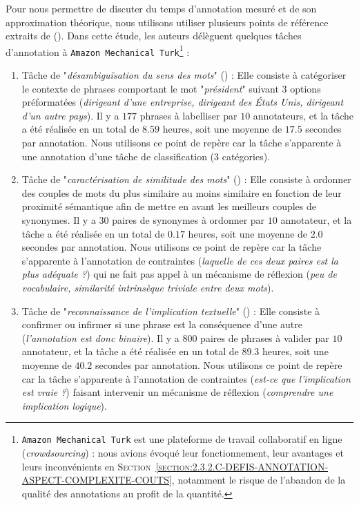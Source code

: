 			Pour nous permettre de discuter du temps d'annotation mesuré et de son approximation théorique, nous utilisons utiliser plusieurs points de référence extraits de (\cite{snow-etal:2008:cheap-fast-it}).
			Dans cette étude, les auteurs délèguent quelques tâches d'annotation à \texttt{Amazon Mechanical Turk}\footnote{
				\texttt{Amazon Mechanical Turk} est une plateforme de travail collaboratif en ligne (\textit{crowdsourcing}) : nous avions évoqué leur fonctionnement, leur avantages et leurs inconvénients en \textsc{Section~\ref{section:2.3.2.C-DEFIS-ANNOTATION-ASPECT-COMPLEXITE-COUTS}}, notamment le risque de l'abandon de la qualité des annotations au profit de la quantité.
			} :
			
			\begin{enumerate}
				\item Tâche de "\textit{désambiguïsation du sens des mots}" (\cite{pradhan-etal:2007:semeval2007-task-17}) :
				Elle consiste à catégoriser le contexte de phrases comportant le mot "\textit{président}" suivant $3$ options préformatées (\textit{dirigeant d'une entreprise, dirigeant des États Unis, dirigeant d'un autre pays}).
				Il y a $177$ phrases à labelliser par $10$ annotateurs, et la tâche a été réalisée en un total de $8.59$ heures, soit une moyenne de $17.5$ secondes par annotation.
				Nous utilisons ce point de repère car la tâche s'apparente à une annotation d'une tâche de classification ($3$ catégories).
				\item Tâche de "\textit{caractérisation de similitude des mots}" (\cite{miller-charles:1991:contextual-correlates-semantic}) :
				Elle consiste à ordonner des couples de mots du plus similaire au moins similaire en fonction de leur proximité sémantique afin de mettre en avant les meilleurs couples de synonymes.
				Il y a $30$ paires de synonymes à ordonner par $10$ annotateur, et la tâche a été réalisée en un total de $0.17$ heures, soit une moyenne de $2.0$ secondes par annotation.
				Nous utilisons ce point de repère car la tâche s'apparente à l'annotation de contraintes (\textit{laquelle de ces deux paires est la plus adéquate ?}) qui ne fait pas appel à un mécanisme de réflexion (\textit{peu de vocabulaire, similarité intrinsèque triviale entre deux mots}).
				\item Tâche de "\textit{reconnaissance de l'implication textuelle}" (\cite{dagan-etal:2005:pascal-recognising-textual}) :
				Elle consiste à confirmer ou infirmer si une phrase est la conséquence d'une autre (\textit{l'annotation est donc binaire}).
				Il y a $800$ paires de phrases à valider par $10$ annotateur, et la tâche a été réalisée en un total de $89.3$ heures, soit une moyenne de $40.2$ secondes par annotation.
				Nous utilisons ce point de repère car la tâche s'apparente à l'annotation de contraintes (\textit{est-ce que l'implication est vraie ?}) faisant intervenir un mécanisme de réflexion (\textit{comprendre une implication logique}).
			\end{enumerate}
